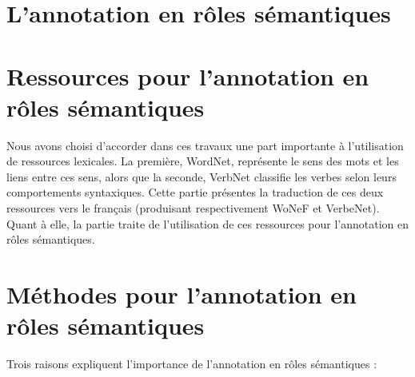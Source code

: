\documentclass[oneside,parskip,draft]{scrbook}
\begin{document}

\setcounter{tocdepth}{3}
\tableofcontents

\mainmatter

\part{L'annotation en rôles sémantiques}





\part{Ressources pour l'annotation en rôles sémantiques}
\label{part:translation}


Nous avons choisi d'accorder dans ces travaux une part importante à
l'utilisation de ressources lexicales. La première, WordNet, représente le sens
des mots et les liens entre ces sens, alors que la seconde, VerbNet classifie
les verbes selon leurs comportements syntaxiques. Cette partie présentes la
traduction de ces deux ressources vers le français (produisant respectivement
WoNeF et VerbeNet). Quant à elle, la partie \ref{part:srl} traite de
l'utilisation de ces ressources pour l'annotation en rôles sémantiques.





\part{Méthodes pour l'annotation en rôles sémantiques}
\label{part:srl}

Trois raisons expliquent l'importance de l'annotation en rôles sémantiques :
\end{document}
